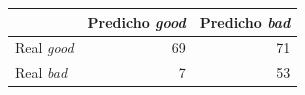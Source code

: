 \begin{tabular}{lrr}
\toprule
 & Predicho \emph{good} & Predicho \emph{bad} \\
\midrule
Real \emph{good} & \num{69} & \num{71} \\
Real \emph{bad} & \num{7} & \num{53} \\
\bottomrule
\end{tabular}
